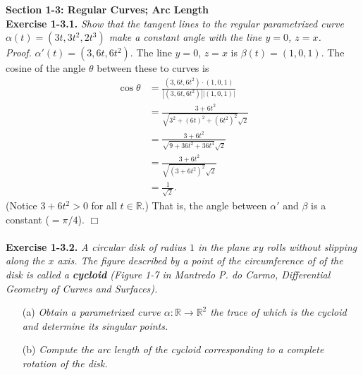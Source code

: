 \documentclass{article}
\begin{document}






\textbf{\large Section 1-3: Regular Curves; Arc Length} \\



\textbf{Exercise 1-3.1.}
\emph{Show that the tangent lines to the regular parametrized curve
$\alpha(t) = (3t, 3t^2, 2t^3)$ make a constant angle with the line $y = 0$, $z = x$. } \\

\emph{Proof.}
$\alpha'(t) = (3, 6t, 6t^2)$.
The line $y = 0$, $z = x$ is $\beta(t) = (1,0,1)$.
The cosine of the angle $\theta$ between these to curves is
\begin{align*}
\cos \theta
&= \frac{(3, 6t, 6t^2) \cdot (1,0,1)}{|(3, 6t, 6t^2)||(1,0,1)|} \\
&= \frac{3+6t^2}{\sqrt{3^2 + (6t)^2 + (6t^2)^2}\sqrt{2}} \\
&= \frac{3+6t^2}{\sqrt{9 + 36 t^2 + 36t^4}\sqrt{2}} \\
&= \frac{3+6t^2}{\sqrt{(3 + 6t^2)^2}\sqrt{2}} \\
&= \frac{1}{\sqrt{2}}.
\end{align*}
(Notice $3 + 6t^2 > 0$ for all $t \in \mathbb{R}$.)
That is, the angle between $\alpha'$ and $\beta$ is a constant ($= \pi/4$).
$\Box$ \\\\






\textbf{Exercise 1-3.2.}
\emph{A circular disk of radius $1$ in the plane $xy$ rolls without slipping
along the $x$ axis.
The figure described by a point of the circumference of of the disk is
called a \textbf{cycloid}
(Figure 1-7 in Mantredo P. do Carmo, Differential Geometry of Curves and Surfaces).}
\begin{enumerate}
  \item[(a)]
  \emph{Obtain a parametrized curve $\alpha: \mathbb{R} \to \mathbb{R}^2$
  the trace of which is the cycloid and determine its singular points.}
  \item[(b)]
  \emph{Compute the arc length of the cycloid
  corresponding to a complete rotation of the disk.} \\
\end{enumerate}
\end{document}
